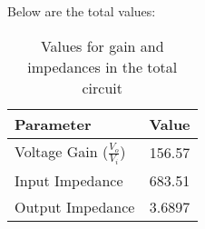 Below are the total values:

\begin{table}[h]
    \centering
    \begin{tabular}{|l|c|}
    \hline
    {\bf Parameter} & {\bf Value} \\ \hline \hline
    Voltage Gain ($\frac{V_{o}}{V_{i}}$)  & 156.57 \\ \hline
    Input Impedance & 683.51 \\ \hline
    Output Impedance  & 3.6897  \\ \hline
    \end{tabular}
    \caption{Values for gain and impedances in the total circuit}
    \label{tab:values}
\end{table}


  





